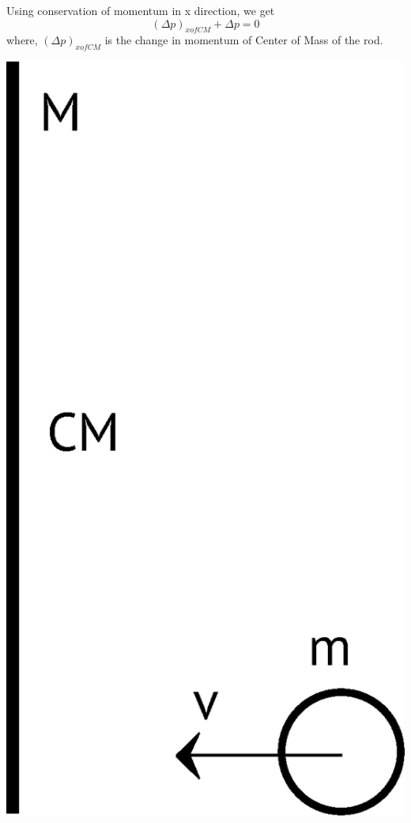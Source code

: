 \documentclass[11pt]{article}%
\begin{document}
Using conservation of momentum in x direction, we get \begin{equation}(\Delta p)_{x of CM}+\Delta p=0\end{equation}
where, $(\Delta p)_{x of CM}$ is the change in momentum of Center of Mass of the rod.
\vskip 1in 
\centerline{\includegraphics[scale=0.3, trim=0in 0in 0in 2in]{topplingrod}}
\end{document}
